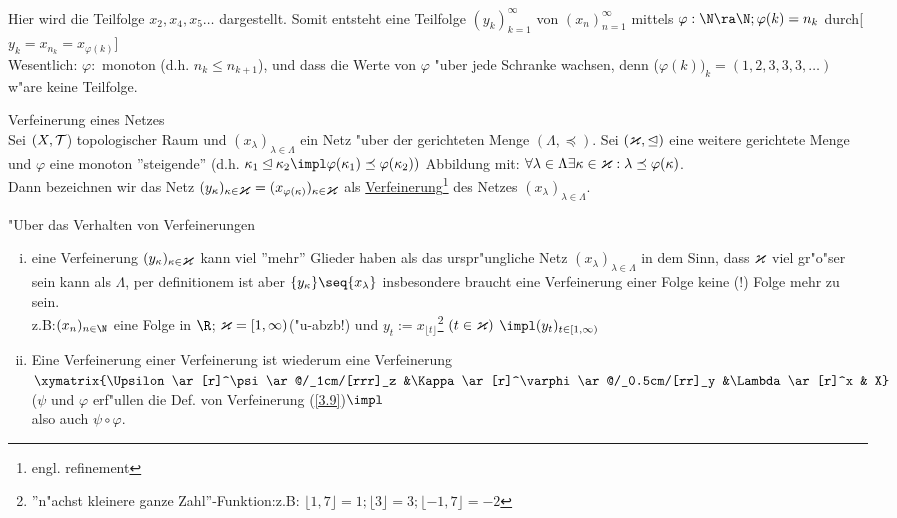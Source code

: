 Hier wird die Teilfolge $x_2, x_4,x_5\dots$ dargestellt. Somit entsteht eine Teilfolge $(y_k)_{k=1}^\infty$ von $(x_n)_{n=1}^\infty$ mittels $\varphi :\N\ra\N ; \varphi (k)= n_k$ durch[$y_k = x_{n_k} =x_{\varphi (k)}$]\\
Wesentlich: $\varphi :$ monoton (d.h. $n_k\leq n_{k+1}$), und dass die Werte von $\varphi$ "uber jede Schranke wachsen, denn ($\varphi (k))_k = (1,2,3,3,3,\dots )$ w"are keine Teilfolge.
\begin{definition}\label{3.9}Verfeinerung eines Netzes\\
Sei $(X,\mathcal T$) topologischer Raum und $(x_\lambda )_{\lambda\in\Lambda}$ ein Netz "uber der gerichteten Menge $(\Lambda ,\preceq )$. Sei $(\mbox{\large\mbox{$\varkappa$}} ,\unlhd )$ eine weitere gerichtete Menge und $\varphi$ eine monoton ''steigende'' (d.h. $\kappa_1\unlhd\kappa_2\impl\varphi (\kappa_1)\preceq\varphi (\kappa_2))$ Abbildung mit: $\forall\lambda\in\Lambda\exists\kappa\in\mbox{\large\mbox{$\varkappa$}} :\lambda\preceq\varphi (\kappa )$.\\
Dann bezeichnen wir das Netz $(y_\kappa )_{\kappa\in\mbox{\large\mbox{$\varkappa$}}} =(x_{\varphi (\kappa )})_{\kappa\in\mbox{\large\mbox{$\varkappa$}}}$ als \ul{Verfeinerung}\footnote{engl. refinement} des Netzes $(x_\lambda)_{\lambda\in\Lambda}.$
\end{definition}
\begin{bem}\label{3.10}"Uber das Verhalten von Verfeinerungen
\begin{enumerate}[(i)]
\item eine Verfeinerung $(y_\kappa )_{\kappa\in\mbox{\large\mbox{$\varkappa$}}}$ kann viel ''mehr'' Glieder haben als das urspr"ungliche Netz $(x_\lambda)_{\lambda\in\Lambda}$ in dem Sinn, dass $\mbox{\large\mbox{$\varkappa$}}$ viel gr"o"ser sein kann als $\Lambda$, per definitionem ist aber $\{y_\kappa\}\seq\{ x_\lambda\}$ insbesondere braucht eine Verfeinerung einer Folge keine (!) Folge mehr zu sein.\\
z.B:$(x_n )_{n\in\N}$ eine Folge in $\R$; $\mbox{\large\mbox{$\varkappa$}}=[1,\infty )$("u-abzb!) und $y_t := x_{\lfloor t\rfloor}$\footnote{''n"achst kleinere ganze Zahl''-Funktion:z.B: $\lfloor 1,7\rfloor =1; \lfloor 3\rfloor =3; \lfloor -1,7\rfloor =-2$} {\scriptsize $(t\in\mbox{\large\mbox{$\varkappa$}} )$} $\impl (y_t )_{t\in [1,\infty )}$
\item Eine Verfeinerung einer Verfeinerung ist wiederum eine Verfeinerung\\
$\xymatrix{\Upsilon\ar[r]^\psi\ar@/_1cm/[rrr]_z &\Kappa\ar[r]^\varphi\ar@/_0.5cm/[rr]_y &\Lambda\ar[r]^x & X}$ ($\psi$ und $\varphi$ erf"ullen die Def. von Verfeinerung (\ref{3.9})$\impl$\vspace*{-0.9cm}\\
\hspace*{5cm}also auch $\psi\circ\varphi$.
\end{enumerate}
\end{bem}  

